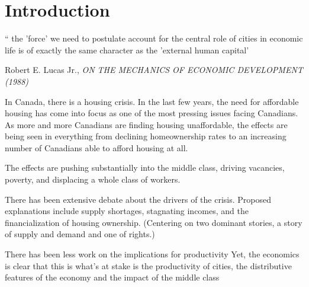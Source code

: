 \chapter{Introduction}

\epigraph{`` the 'force' we need to postulate account for the central role of cities in economic life is of exactly the same character as the 'external human capital'}{Robert E. Lucas Jr., \textit{ON THE MECHANICS OF ECONOMIC DEVELOPMENT (1988)}}


In Canada, there is a housing crisis. In the last few years, the need for affordable housing has come into focus as one of the most pressing issues facing Canadians. %
As more and more Canadians are finding housing unaffordable, the effects are being seen in everything from declining homeownership rates to an increasing number of Canadians able to afford housing at all.

The effects are pushing substantially into the middle class, driving vacancies, poverty, and displacing a whole class of workers. %

There has been extensive debate about the drivers of the crisis.  Proposed explanations include supply shortages, stagnating incomes, and the financialization of housing ownership.
(Centering on two dominant stories, a story of supply and demand and one of rights.) %

There has been less work on the implications for productivity %
Yet, the economics is clear that %
this is what's at stake is the productivity of cities, the distributive features of the economy and the impact of the middle class %

